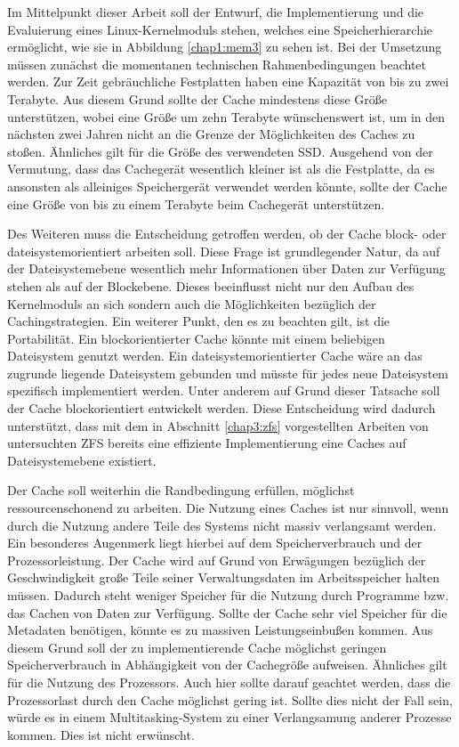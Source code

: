 Im Mittelpunkt dieser Arbeit soll der Entwurf, die Implementierung und die Evaluierung eines Linux-Kernelmoduls stehen, welches eine Speicherhierarchie
ermöglicht, wie sie in Abbildung \ref{chap1:mem3} zu sehen ist. Bei der Umsetzung müssen zunächst die momentanen technischen Rahmenbedingungen beachtet werden.
Zur Zeit gebräuchliche Festplatten haben eine Kapazität von bis zu zwei Terabyte. Aus diesem Grund sollte der Cache mindestens diese Größe unterstützen, wobei
eine Größe um zehn Terabyte wünschenswert ist, um in den nächsten zwei Jahren nicht an die Grenze der Möglichkeiten des Caches zu stoßen. Ähnliches gilt für die
Größe des verwendeten \ac{SSD}. Ausgehend von der Vermutung, dass das Cachegerät wesentlich kleiner ist als die Festplatte, da es ansonsten als alleiniges
Speichergerät verwendet werden könnte, sollte der Cache eine Größe von bis zu einem Terabyte beim Cachegerät unterstützen.

Des Weiteren muss die Entscheidung getroffen werden, ob der Cache block- oder dateisystemorientiert arbeiten soll. Diese Frage ist grundlegender Natur, da auf
der Dateisystemebene wesentlich mehr Informationen über Daten zur Verfügung stehen als auf der Blockebene. Dieses beeinflusst nicht nur den Aufbau des
Kernelmoduls an sich sondern auch die Möglichkeiten bezüglich der Cachingstrategien. Ein weiterer Punkt, den es zu beachten gilt, ist die Portabilität. Ein
blockorientierter Cache könnte mit einem beliebigen Dateisystem genutzt werden. Ein dateisystemorientierter Cache wäre an das zugrunde liegende Dateisystem
gebunden und müsste für jedes neue Dateisystem spezifisch implementiert werden. Unter anderem auf Grund dieser Tatsache soll der Cache blockorientiert entwickelt
werden. Diese Entscheidung wird dadurch unterstützt, dass mit dem in Abschnitt \ref{chap3:zfs} vorgestellten Arbeiten von \textcite{zfs1,zfs2} untersuchten
ZFS bereits eine effiziente Implementierung eine Caches auf Dateisystemebene existiert.

Der Cache soll weiterhin die Randbedingung erfüllen, möglichst ressourcenschonend zu arbeiten. Die Nutzung eines Caches ist nur sinnvoll, wenn durch die Nutzung
andere Teile des Systems nicht massiv  verlangsamt werden. Ein besonderes Augenmerk liegt hierbei auf dem Speicherverbrauch und der Prozessorleistung. Der Cache
wird auf Grund von Erwägungen bezüglich der Geschwindigkeit große Teile seiner Verwaltungsdaten im Arbeitsspeicher halten müssen. Dadurch steht weniger Speicher
für die Nutzung durch Programme bzw. das Cachen von Daten zur Verfügung. Sollte der Cache sehr viel Speicher für die Metadaten benötigen, könnte es zu massiven
Leistungseinbußen kommen. Aus diesem Grund soll der zu implementierende Cache möglichst geringen Speicherverbrauch in Abhängigkeit von der Cachegröße aufweisen.
Ähnliches gilt für die Nutzung des Prozessors. Auch hier sollte darauf geachtet werden, dass die Prozessorlast durch den Cache möglichst gering ist. Sollte dies
nicht der Fall sein, würde es in einem Multitasking-System zu einer Verlangsamung anderer Prozesse kommen. Dies ist nicht erwünscht.

